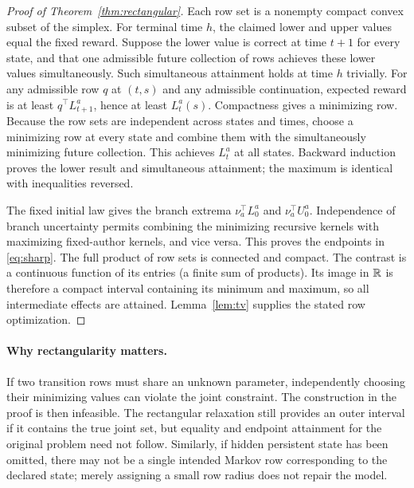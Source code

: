 \begin{proof}[Proof of Theorem~\ref{thm:rectangular}]
Each row set is a nonempty compact convex subset of the simplex. For terminal time $h$, the claimed lower and upper values equal the fixed reward. Suppose the lower value is correct at time $t+1$ for every state, and that one admissible future collection of rows achieves these lower values simultaneously. Such simultaneous attainment holds at time $h$ trivially. For any admissible row $q$ at $(t,s)$ and any admissible continuation, expected reward is at least $q^\top L_{t+1}^a$, hence at least $L_t^a(s)$. Compactness gives a minimizing row. Because the row sets are independent across states and times, choose a minimizing row at every state and combine them with the simultaneously minimizing future collection. This achieves $L_t^a$ at all states. Backward induction proves the lower result and simultaneous attainment; the maximum is identical with inequalities reversed.

The fixed initial law gives the branch extrema $\nu_a^\top L_0^a$ and $\nu_a^\top U_0^a$. Independence of branch uncertainty permits combining the minimizing recursive kernels with maximizing fixed-author kernels, and vice versa. This proves the endpoints in \eqref{eq:sharp}. The full product of row sets is connected and compact. The contrast is a continuous function of its entries (a finite sum of products). Its image in $\mathbb R$ is therefore a compact interval containing its minimum and maximum, so all intermediate effects are attained. Lemma~\ref{lem:tv} supplies the stated row optimization.
\end{proof}

\paragraph{Why rectangularity matters.}
If two transition rows must share an unknown parameter, independently choosing their minimizing values can violate the joint constraint. The construction in the proof is then infeasible. The rectangular relaxation still provides an outer interval if it contains the true joint set, but equality and endpoint attainment for the original problem need not follow. Similarly, if hidden persistent state has been omitted, there may not be a single intended Markov row corresponding to the declared state; merely assigning a small row radius does not repair the model.

